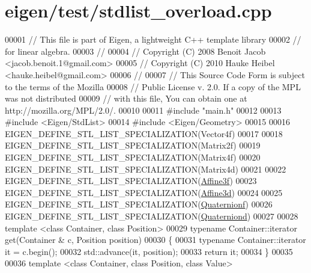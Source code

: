\hypertarget{eigen_2test_2stdlist__overload_8cpp_source}{}\section{eigen/test/stdlist\+\_\+overload.cpp}
\label{eigen_2test_2stdlist__overload_8cpp_source}

\begin{DoxyCode}
00001 \textcolor{comment}{// This file is part of Eigen, a lightweight C++ template library}
00002 \textcolor{comment}{// for linear algebra.}
00003 \textcolor{comment}{//}
00004 \textcolor{comment}{// Copyright (C) 2008 Benoit Jacob <jacob.benoit.1@gmail.com>}
00005 \textcolor{comment}{// Copyright (C) 2010 Hauke Heibel <hauke.heibel@gmail.com>}
00006 \textcolor{comment}{//}
00007 \textcolor{comment}{// This Source Code Form is subject to the terms of the Mozilla}
00008 \textcolor{comment}{// Public License v. 2.0. If a copy of the MPL was not distributed}
00009 \textcolor{comment}{// with this file, You can obtain one at http://mozilla.org/MPL/2.0/.}
00010 
00011 \textcolor{preprocessor}{#include "main.h"}
00012 
00013 \textcolor{preprocessor}{#include <Eigen/StdList>}
00014 \textcolor{preprocessor}{#include <Eigen/Geometry>}
00015 
00016 EIGEN\_DEFINE\_STL\_LIST\_SPECIALIZATION(Vector4f)
00017 
00018 EIGEN\_DEFINE\_STL\_LIST\_SPECIALIZATION(Matrix2f)
00019 EIGEN\_DEFINE\_STL\_LIST\_SPECIALIZATION(Matrix4f)
00020 EIGEN\_DEFINE\_STL\_LIST\_SPECIALIZATION(Matrix4d)
00021 
00022 EIGEN\_DEFINE\_STL\_LIST\_SPECIALIZATION(\hyperlink{group___geometry___module_class_eigen_1_1_transform}{Affine3f})
00023 EIGEN\_DEFINE\_STL\_LIST\_SPECIALIZATION(\hyperlink{group___geometry___module_class_eigen_1_1_transform}{Affine3d})
00024 
00025 EIGEN\_DEFINE\_STL\_LIST\_SPECIALIZATION(\hyperlink{group___geometry___module_class_eigen_1_1_quaternion}{Quaternionf})
00026 EIGEN\_DEFINE\_STL\_LIST\_SPECIALIZATION(\hyperlink{group___geometry___module_class_eigen_1_1_quaternion}{Quaterniond})
00027 
00028 \textcolor{keyword}{template} <\textcolor{keyword}{class} Container, \textcolor{keyword}{class} Position>
00029 \textcolor{keyword}{typename} Container::iterator \textcolor{keyword}{get}(Container & c, Position position)
00030 \{
00031   \textcolor{keyword}{typename} Container::iterator it = c.begin();
00032   std::advance(it, position);
00033   \textcolor{keywordflow}{return} it;
00034 \}
00035 
00036 \textcolor{keyword}{template} <\textcolor{keyword}{class} Container, \textcolor{keyword}{class} Position, \textcolor{keyword}{class} Value>

\end{DoxyCode}
